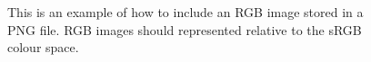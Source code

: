 \documentclass[10pt,twocolumn,letterpaper]{article}
\begin{document}
\begin{figure}[th]
%
\caption{
	This is an example of how to include an RGB image stored in a 
    PNG file.   
    RGB images should represented relative to the 
    sRGB colour space.
}
\label{fig1a}
\end{figure}
\end{document}
